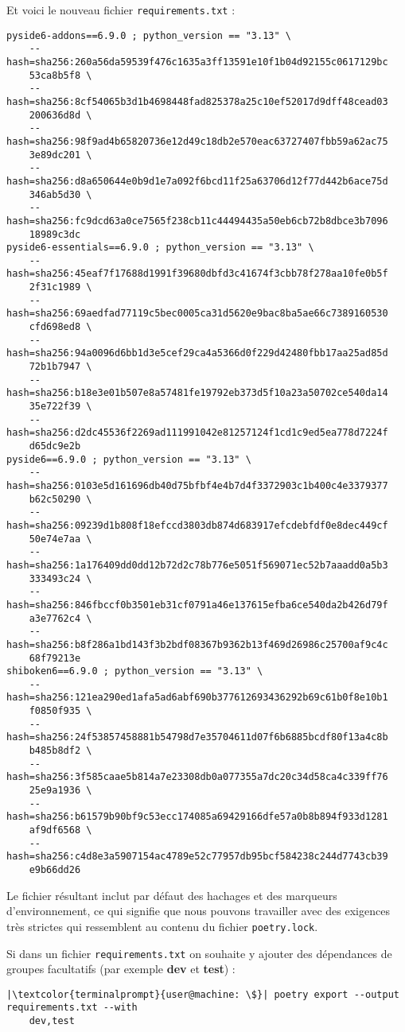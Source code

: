 Et voici le nouveau fichier \texttt{requirements.txt} :
\begin{verbatim}
pyside6-addons==6.9.0 ; python_version == "3.13" \
    --hash=sha256:260a56da59539f476c1635a3ff13591e10f1b04d92155c0617129bc
    53ca8b5f8 \
    --hash=sha256:8cf54065b3d1b4698448fad825378a25c10ef52017d9dff48cead03
    200636d8d \
    --hash=sha256:98f9ad4b65820736e12d49c18db2e570eac63727407fbb59a62ac75
    3e89dc201 \
    --hash=sha256:d8a650644e0b9d1e7a092f6bcd11f25a63706d12f77d442b6ace75d
    346ab5d30 \
    --hash=sha256:fc9dcd63a0ce7565f238cb11c44494435a50eb6cb72b8dbce3b7096
    18989c3dc
pyside6-essentials==6.9.0 ; python_version == "3.13" \
    --hash=sha256:45eaf7f17688d1991f39680dbfd3c41674f3cbb78f278aa10fe0b5f
    2f31c1989 \
    --hash=sha256:69aedfad77119c5bec0005ca31d5620e9bac8ba5ae66c7389160530
    cfd698ed8 \
    --hash=sha256:94a0096d6bb1d3e5cef29ca4a5366d0f229d42480fbb17aa25ad85d
    72b1b7947 \
    --hash=sha256:b18e3e01b507e8a57481fe19792eb373d5f10a23a50702ce540da14
    35e722f39 \
    --hash=sha256:d2dc45536f2269ad111991042e81257124f1cd1c9ed5ea778d7224f
    d65dc9e2b
pyside6==6.9.0 ; python_version == "3.13" \
    --hash=sha256:0103e5d161696db40d75bfbf4e4b7d4f3372903c1b400c4e3379377
    b62c50290 \
    --hash=sha256:09239d1b808f18efccd3803db874d683917efcdebfdf0e8dec449cf
    50e74e7aa \
    --hash=sha256:1a176409dd0dd12b72d2c78b776e5051f569071ec52b7aaadd0a5b3
    333493c24 \
    --hash=sha256:846fbccf0b3501eb31cf0791a46e137615efba6ce540da2b426d79f
    a3e7762c4 \
    --hash=sha256:b8f286a1bd143f3b2bdf08367b9362b13f469d26986c25700af9c4c
    68f79213e
shiboken6==6.9.0 ; python_version == "3.13" \
    --hash=sha256:121ea290ed1afa5ad6abf690b377612693436292b69c61b0f8e10b1
    f0850f935 \
    --hash=sha256:24f53857458881b54798d7e35704611d07f6b6885bcdf80f13a4c8b
    b485b8df2 \
    --hash=sha256:3f585caae5b814a7e23308db0a077355a7dc20c34d58ca4c339ff76
    25e9a1936 \
    --hash=sha256:b61579b90bf9c53ecc174085a69429166dfe57a0b8b894f933d1281
    af9df6568 \
    --hash=sha256:c4d8e3a5907154ac4789e52c77957db95bcf584238c244d7743cb39
    e9b66dd26
\end{verbatim}

Le fichier résultant inclut par défaut des hachages et des marqueurs d’environnement, ce qui signifie que nous pouvons travailler avec des exigences très strictes qui ressemblent au contenu du fichier \texttt{poetry.lock}.

Si dans un fichier \texttt{requirements.txt} on souhaite y ajouter des dépendances de groupes facultatifs (par exemple \textbf{dev} et \textbf{test}) :
\begin{lstlisting}[style=terminal]
|\textcolor{terminalprompt}{user@machine: \$}| poetry export --output requirements.txt --with
    dev,test
\end{lstlisting}


